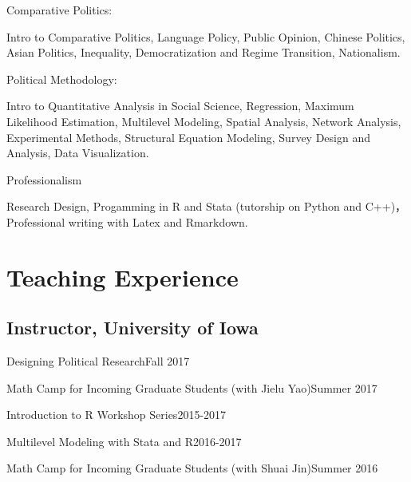 \documentclass[10.5pt,]{article}
\providecommand{\tightlist}{%
	\setlength{\itemsep}{0pt}\setlength{\parskip}{0pt}}
\renewenvironment{itemize}{
	\begin{list}{}{
			\setlength{\leftmargin}{1.5em}
		}
	}{
	\end{list}
}
\begin{document}
\begin{itemize}
\tightlist
\item
  Comparative Politics:

  \begin{itemize}
  \tightlist
  \item
    Intro to Comparative Politics, Language Policy, Public Opinion,
    Chinese Politics, Asian Politics, Inequality, Democratization and
    Regime Transition, Nationalism.
  \end{itemize}
\item
  Political Methodology:

  \begin{itemize}
  \tightlist
  \item
    Intro to Quantitative Analysis in Social Science, Regression,
    Maximum Likelihood Estimation, Multilevel Modeling, Spatial
    Analysis, Network Analysis, Experimental Methods, Structural
    Equation Modeling, Survey Design and Analysis, Data Visualization.
  \end{itemize}
\item
  Professionalism

  \begin{itemize}
  \tightlist
  \item
    Research Design, Progamming in R and Stata (tutorship on Python and
    C++)， Professional writing with Latex and Rmarkdown.
  \end{itemize}
\end{itemize}

\section{Teaching Experience}\label{teaching-experience}

\subsection{Instructor, University of
Iowa}\label{instructor-university-of-iowa}

\begin{itemize}
\tightlist
\item
  Designing Political Research\hfill Fall 2017
\item
  Math Camp for Incoming Graduate Students (with Jielu Yao)\hfill Summer
  2017
\item
  Introduction to R Workshop Series\hfill 2015-2017
\item
  Multilevel Modeling with Stata and R\hfill 2016-2017
\item
  Math Camp for Incoming Graduate Students (with Shuai Jin)\hfill Summer
  2016
\end{itemize}
\end{document}
